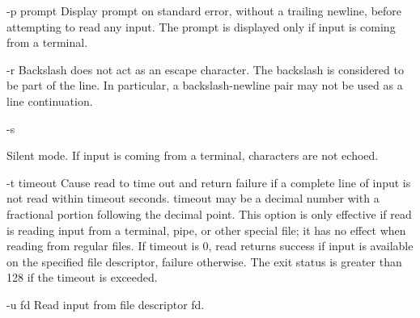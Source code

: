 -p prompt
Display prompt on standard error, without a trailing newline, before attempting to read any input. The prompt is displayed only if input is coming from a terminal.

-r
Backslash does not act as an escape character. The backslash is considered to be part of the line. In particular, a backslash-newline pair may not be used as a line continuation.

-s

Silent mode. If input is coming from a terminal, characters are not echoed.

-t timeout
Cause read to time out and return failure if a complete line of input is not read within timeout seconds. timeout may be a decimal number with a fractional portion following the decimal point. This option is only effective if read is reading input from a terminal, pipe, or other special file; it has no effect when reading from regular files. If timeout is 0, read returns success if input is available on the specified file descriptor, failure otherwise. The exit status is greater than 128 if the timeout is exceeded.

-u fd
Read input from file descriptor fd.

